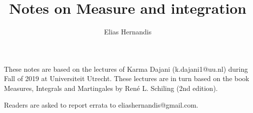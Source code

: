 \documentclass{book}
\author{Elias Hernandis}
\title{Notes on Measure and integration}
\begin{document}
	\maketitle
	
	These notes are based on the lectures of Karma Dajani (k.dajani1@uu.nl) during Fall of 2019 at Universiteit Utrecht. These lectures are in turn based on the book Measures, Integrals and Martingales by René L. Schiling (2nd edition).
	
	Readers are asked to report errata to eliashernandis@gmail.com.
	
	
	
\end{document}
